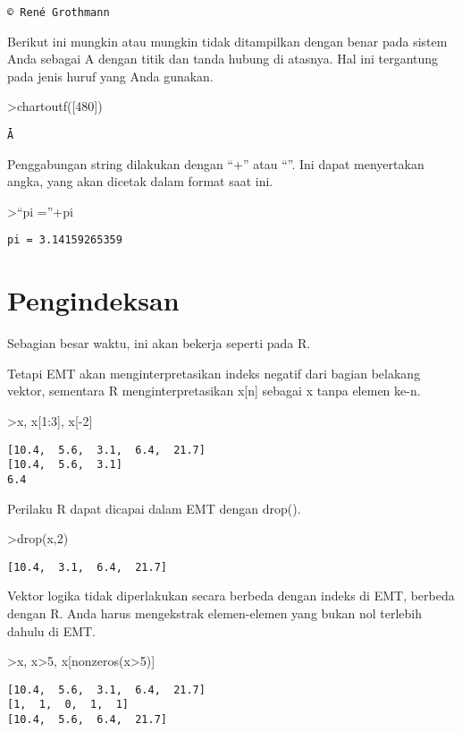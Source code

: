 \documentclass[
]{book}
\begin{document}
\begin{verbatim}
© René Grothmann
\end{verbatim}

Berikut ini mungkin atau mungkin tidak ditampilkan dengan benar pada sistem Anda sebagai A dengan titik dan tanda hubung di atasnya. Hal ini tergantung pada jenis huruf yang Anda gunakan.

\textgreater chartoutf({[}480{]})

\begin{verbatim}
Ǡ
\end{verbatim}

Penggabungan string dilakukan dengan ``+'' atau ``\textbar{}''. Ini dapat menyertakan angka, yang akan dicetak dalam format saat ini.

\textgreater{}``pi =''+pi

\begin{verbatim}
pi = 3.14159265359
\end{verbatim}

\section{Pengindeksan}\label{pengindeksan}

Sebagian besar waktu, ini akan bekerja seperti pada R.

Tetapi EMT akan menginterpretasikan indeks negatif dari bagian belakang vektor, sementara R menginterpretasikan x{[}n{]} sebagai x tanpa elemen ke-n.

\textgreater x, x{[}1:3{]}, x{[}-2{]}

\begin{verbatim}
[10.4,  5.6,  3.1,  6.4,  21.7]
[10.4,  5.6,  3.1]
6.4
\end{verbatim}

Perilaku R dapat dicapai dalam EMT dengan drop().

\textgreater drop(x,2)

\begin{verbatim}
[10.4,  3.1,  6.4,  21.7]
\end{verbatim}

Vektor logika tidak diperlakukan secara berbeda dengan indeks di EMT, berbeda dengan R. Anda harus mengekstrak elemen-elemen yang bukan nol terlebih dahulu di EMT.

\textgreater x, x\textgreater5, x{[}nonzeros(x\textgreater5){]}

\begin{verbatim}
[10.4,  5.6,  3.1,  6.4,  21.7]
[1,  1,  0,  1,  1]
[10.4,  5.6,  6.4,  21.7]
\end{verbatim}
\end{document}

